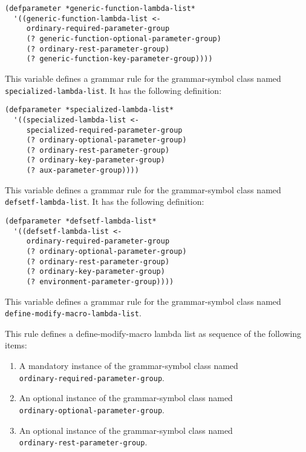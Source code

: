 \begin{verbatim}
(defparameter *generic-function-lambda-list*
  '((generic-function-lambda-list <-
     ordinary-required-parameter-group
     (? generic-function-optional-parameter-group)
     (? ordinary-rest-parameter-group)
     (? generic-function-key-parameter-group))))
\end{verbatim}


This variable defines a grammar rule for the grammar-symbol class
named \texttt{specialized-lambda-list}.  It has the following
definition:

\begin{verbatim}
(defparameter *specialized-lambda-list*
  '((specialized-lambda-list <-
     specialized-required-parameter-group
     (? ordinary-optional-parameter-group)
     (? ordinary-rest-parameter-group)
     (? ordinary-key-parameter-group)
     (? aux-parameter-group))))
\end{verbatim}


This variable defines a grammar rule for the grammar-symbol class
named \texttt{defsetf-lambda-list}.  It has the following
definition:

\begin{verbatim}
(defparameter *defsetf-lambda-list*
  '((defsetf-lambda-list <-
     ordinary-required-parameter-group
     (? ordinary-optional-parameter-group)
     (? ordinary-rest-parameter-group)
     (? ordinary-key-parameter-group)
     (? environment-parameter-group))))
\end{verbatim}


This variable defines a grammar rule for the grammar-symbol class
named \texttt{define-modify-macro-lambda-list}.

This rule defines a define-modify-macro lambda list as sequence of the
following items:

\begin{enumerate}
\item A mandatory instance of the grammar-symbol class named\\
  \texttt{ordinary-required-parameter-group}.
\item An optional instance of the grammar-symbol class named\\
  \texttt{ordinary-optional-parameter-group}.
\item An optional instance of the grammar-symbol class named\\
\texttt{ordinary-rest-parameter-group}.
\end{enumerate}

